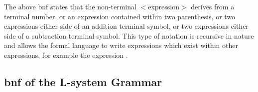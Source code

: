 The above \acrshort{bnf} states that the non-terminal $<$expression$>$ derives from a terminal number, or an expression contained within two parenthesis, or two expressions either side of an addition terminal symbol, or two expressions either side of a subtraction terminal symbol. This type of notation is recursive in nature and allows the formal language to write expressions which exist within other expressions, for example the expression . \\

\subsection{\acrlong{bnf} of the L-system Grammar} \label{L-system Grammar}
\begin{singlespace}
	\begin{bnf*}
		{\bnfes \bnfor {} \bnfsp {}}\\
		{\bnfes \bnfor {} }\\
		{ \bnfor {} 
		\bnfor {} 
		\bnfor {} 
		\bnfor {} 
		\bnfor {}}\\
		{ \bnfsp \bnfts{=} \bnfsp {} \bnfts{;}}\\
		{}\\
		{\bnfts{[a-zA-Z\_][a-zA-Z0-9\_]*}}\\
		{ \bnfor \bnfts{-} \bnfsp {}}\\
		{\bnfts{\{}  \bnfts{,}  \bnfts{\}}}\\
		{ \bnfsp {} \bnfsp {} \bnfts{;}}\\
		{ \bnfsp {} \bnfsp {} \bnfts{;}}\\ 
		{ \bnfor \bnfts{+} 
		\bnfor \bnfts{-} 
		\bnfor \bnfts{/} 
		\bnfor \bnfts{$\backslash$} 
		\bnfor \bnfts{$\land$}
		\bnfor \bnfts{\&}
		\bnfor \bnfts{\$}
		\bnfor \bnfts{[}
		\bnfor \bnfts{]}
		\bnfor \bnfts{!}}\\
		\\

\end{bnf*}
\end{singlespace}
